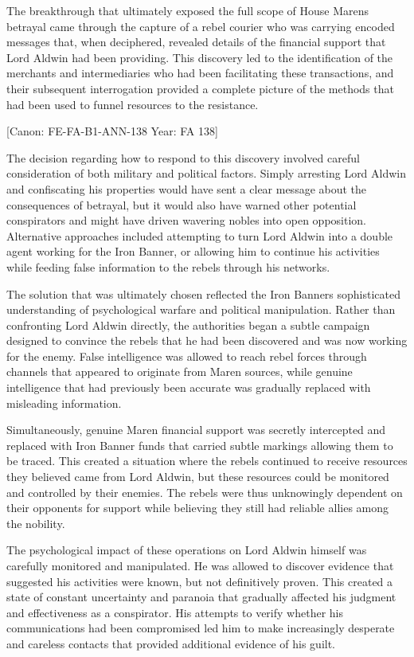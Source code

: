 The breakthrough that ultimately exposed the full scope of House
Maren\textquotesingle s betrayal came through the capture of a rebel
courier who was carrying encoded messages that, when deciphered,
revealed details of the financial support that Lord Aldwin had been
providing. This discovery led to the identification of the merchants and
intermediaries who had been facilitating these transactions, and their
subsequent interrogation provided a complete picture of the methods that
had been used to funnel resources to the resistance.

{[}Canon: FE-FA-B1-ANN-138 \textbar{} Year: FA 138{]}

The decision regarding how to respond to this discovery involved careful
consideration of both military and political factors. Simply arresting
Lord Aldwin and confiscating his properties would have sent a clear
message about the consequences of betrayal, but it would also have
warned other potential conspirators and might have driven wavering
nobles into open opposition. Alternative approaches included attempting
to turn Lord Aldwin into a double agent working for the Iron Banner, or
allowing him to continue his activities while feeding false information
to the rebels through his networks.

The solution that was ultimately chosen reflected the Iron
Banner\textquotesingle s sophisticated understanding of psychological
warfare and political manipulation. Rather than confronting Lord Aldwin
directly, the authorities began a subtle campaign designed to convince
the rebels that he had been discovered and was now working for the
enemy. False intelligence was allowed to reach rebel forces through
channels that appeared to originate from Maren sources, while genuine
intelligence that had previously been accurate was gradually replaced
with misleading information.

Simultaneously, genuine Maren financial support was secretly intercepted
and replaced with Iron Banner funds that carried subtle markings
allowing them to be traced. This created a situation where the rebels
continued to receive resources they believed came from Lord Aldwin, but
these resources could be monitored and controlled by their enemies. The
rebels were thus unknowingly dependent on their opponents for support
while believing they still had reliable allies among the nobility.

The psychological impact of these operations on Lord Aldwin himself was
carefully monitored and manipulated. He was allowed to discover evidence
that suggested his activities were known, but not definitively proven.
This created a state of constant uncertainty and paranoia that gradually
affected his judgment and effectiveness as a conspirator. His attempts
to verify whether his communications had been compromised led him to
make increasingly desperate and careless contacts that provided
additional evidence of his guilt.


